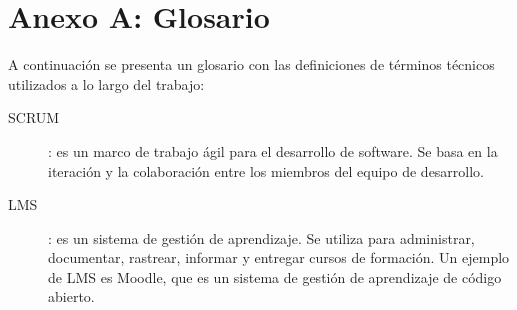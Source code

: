 \chapter*{Anexo A: Glosario}

A continuación se presenta un glosario con las definiciones de términos técnicos utilizados a lo largo del trabajo:

\begin{description}
    \item[\hypertarget{scrum}{SCRUM}]: es un marco de trabajo ágil para el desarrollo de software. Se basa en la iteración y la colaboración entre los miembros del equipo de desarrollo.
    \item [\hypertarget{lms}{LMS}]: es un sistema de gestión de aprendizaje. Se utiliza para administrar, documentar, rastrear, informar y entregar cursos de formación. Un ejemplo de LMS es Moodle, que es un sistema de gestión de aprendizaje de código abierto.
\end{description}

\endinput